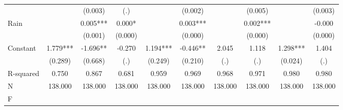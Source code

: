 {\begin{tabular}{l*{9}{c}}
                    &               &     (0.003)   &         (.)   &               &     (0.002)   &               &     (0.005)   &               &     (0.003)   \\
Rain                &               &       0.005***&       0.000*  &               &       0.003***&               &       0.002***&               &      -0.000   \\
                    &               &     (0.001)   &     (0.000)   &               &     (0.000)   &               &     (0.000)   &               &     (0.000)   \\
Constant            &       1.779***&      -1.696** &      -0.270   &       1.194***&      -0.446** &       2.045   &       1.118   &       1.298***&       1.404   \\
                    &     (0.289)   &     (0.668)   &         (.)   &     (0.249)   &     (0.210)   &         (.)   &         (.)   &     (0.024)   &         (.)   \\
\hline
R-squared           &       0.750   &       0.867   &       0.681   &       0.959   &       0.969   &       0.968   &       0.971   &       0.980   &       0.980   \\
N                   &     138.000   &     138.000   &     138.000   &     138.000   &     138.000   &     138.000   &     138.000   &     138.000   &     138.000   \\
F                   &               &               &               &               &               &               &               &               &               \\
\hline\hline
\end{tabular}
}
